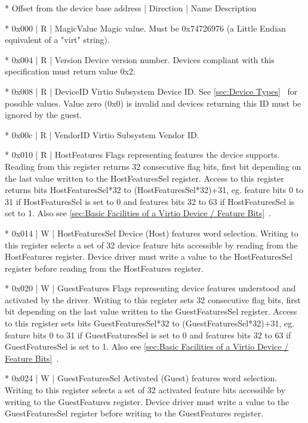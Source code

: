 * Offset from the device base address | Direction | Name
  Description

* 0x000 | R | MagicValue
  Magic value. Must be 0x74726976 (a Little Endian equivalent
  of a "virt" string).

* 0x004 | R | Version
  Device version number. Devices compliant with this specification
  must return value 0x2.

* 0x008 | R | DeviceID
  Virtio Subsystem Device ID.
  See \ref{sec:Device Types}~ for possible values. Value zero (0x0)
  is invalid and devices returning this ID must be ignored
  by the guest.

* 0x00c | R | VendorID
  Virtio Subsystem Vendor ID.

* 0x010 | R | HostFeatures
  Flags representing features the device supports.
  Reading from this register returns 32 consecutive flag bits,
  first bit depending on the last value written to the
  HostFeaturesSel register. Access to this register returns
  bits HostFeaturesSel*32 to (HostFeaturesSel*32)+31, eg.
  feature bits 0 to 31 if HostFeaturesSel is set to 0 and
  features bits 32 to 63 if HostFeaturesSel is set to 1.
  Also see \ref{sec:Basic Facilities of a Virtio Device / Feature Bits}~.

* 0x014 | W | HostFeaturesSel
  Device (Host) features word selection.
  Writing to this register selects a set of 32 device feature bits
  accessible by reading from the HostFeatures register. Device driver
  must write a value to the HostFeaturesSel register before
  reading from the HostFeatures register.

* 0x020 | W | GuestFeatures
  Flags representing device features understood and activated by
  the driver.
  Writing to this register sets 32 consecutive flag bits, first
  bit depending on the last value written to the GuestFeaturesSel
  register. Access to this register sets bits GuestFeaturesSel*32
  to (GuestFeaturesSel*32)+31, eg. feature bits 0 to 31 if
  GuestFeaturesSel is set to 0 and features bits 32 to 63 if
  GuestFeaturesSel is set to 1. Also see \ref{sec:Basic Facilities of a Virtio Device / Feature Bits}~.

* 0x024 | W | GuestFeaturesSel
  Activated (Guest) features word selection.
  Writing to this register selects a set of 32 activated feature
  bits accessible by writing to the GuestFeatures register.
  Device driver must write a value to the GuestFeaturesSel
  register before writing to the GuestFeatures register.

